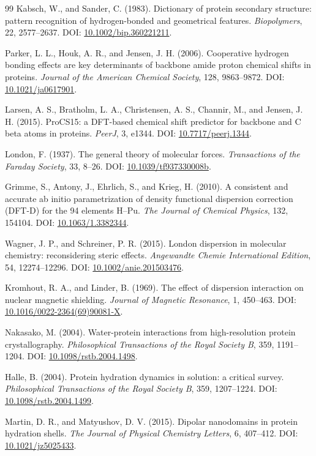 \documentclass[11pt]{article}
\begin{document}
\begin{thebibliography}{99}
Kabsch, W., and Sander, C. (1983).
Dictionary of protein secondary structure: pattern recognition of
hydrogen-bonded and geometrical features.
\emph{Biopolymers}, 22, 2577--2637.
DOI: \href{https://doi.org/10.1002/bip.360221211}{10.1002/bip.360221211}.

Parker, L. L., Houk, A. R., and Jensen, J. H. (2006).
Cooperative hydrogen bonding effects are key determinants of backbone amide
proton chemical shifts in proteins.
\emph{Journal of the American Chemical Society}, 128, 9863--9872.
DOI: \href{https://doi.org/10.1021/ja0617901}{10.1021/ja0617901}.

Larsen, A. S., Bratholm, L. A., Christensen, A. S., Channir, M.,
and Jensen, J. H. (2015).
ProCS15: a DFT-based chemical shift predictor for backbone and C beta atoms
in proteins.
\emph{PeerJ}, 3, e1344.
DOI: \href{https://doi.org/10.7717/peerj.1344}{10.7717/peerj.1344}.

London, F. (1937).
The general theory of molecular forces.
\emph{Transactions of the Faraday Society}, 33, 8--26.
DOI: \href{https://doi.org/10.1039/tf937330008b}{10.1039/tf937330008b}.

Grimme, S., Antony, J., Ehrlich, S., and Krieg, H. (2010).
A consistent and accurate ab initio parametrization of density functional
dispersion correction (DFT-D) for the 94 elements H--Pu.
\emph{The Journal of Chemical Physics}, 132, 154104.
DOI: \href{https://doi.org/10.1063/1.3382344}{10.1063/1.3382344}.

Wagner, J. P., and Schreiner, P. R. (2015).
London dispersion in molecular chemistry: reconsidering steric effects.
\emph{Angewandte Chemie International Edition}, 54, 12274--12296.
DOI: \href{https://doi.org/10.1002/anie.201503476}{10.1002/anie.201503476}.

Kromhout, R. A., and Linder, B. (1969).
The effect of dispersion interaction on nuclear magnetic shielding.
\emph{Journal of Magnetic Resonance}, 1, 450--463.
DOI: \href{https://doi.org/10.1016/0022-2364(69)90081-X}{10.1016/0022-2364(69)90081-X}.

Nakasako, M. (2004).
Water-protein interactions from high-resolution protein crystallography.
\emph{Philosophical Transactions of the Royal Society B}, 359, 1191--1204.
DOI: \href{https://doi.org/10.1098/rstb.2004.1498}{10.1098/rstb.2004.1498}.

Halle, B. (2004).
Protein hydration dynamics in solution: a critical survey.
\emph{Philosophical Transactions of the Royal Society B}, 359, 1207--1224.
DOI: \href{https://doi.org/10.1098/rstb.2004.1499}{10.1098/rstb.2004.1499}.

Martin, D. R., and Matyushov, D. V. (2015).
Dipolar nanodomains in protein hydration shells.
\emph{The Journal of Physical Chemistry Letters}, 6, 407--412.
DOI: \href{https://doi.org/10.1021/jz5025433}{10.1021/jz5025433}.

\end{thebibliography}
\end{document}
